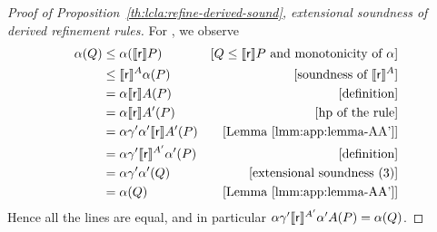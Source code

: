 \begin{proof}[Proof of Proposition~\ref{th:lcla:refine-derived-sound}, extensional soundness of derived refinement rules]
	For , we observe
	\begin{align*}
		\alpha(Q) & \le \alpha(\llbracket\mathsf{r}\rrbracket P )                   & [Q \le \llbracket\mathsf{r}\rrbracket P \text{ and monotonicity of }\alpha] \\
		          & \le \llbracket\mathsf{r}\rrbracket^{A} \alpha(P)                & [\text{soundness of }\llbracket\mathsf{r}\rrbracket^{A}]                    \\
		          & = \alpha \llbracket\mathsf{r}\rrbracket A(P)                    & [\text{definition}]                                        \\
		          & = \alpha \llbracket\mathsf{r}\rrbracket A'(P)                   & [\text{hp of the rule}]                                    \\
		          & = \alpha \gamma' \alpha' \llbracket\mathsf{r}\rrbracket A'(P)   & [\text{Lemma~\ref{lmm:app:lemma-AA'}}]                     \\
		          & = \alpha \gamma' \llbracket\mathsf{r}\rrbracket^{A'} \alpha'(P) & [\text{definition}]                                        \\
		          & = \alpha \gamma' \alpha'(Q)                    & [\text{extensional soundness (3)}]                         \\
		          & = \alpha(Q)                                    & [\text{Lemma~\ref{lmm:app:lemma-AA'}}]
	\end{align*}
	Hence all the lines are equal, and in particular $\alpha \gamma' \llbracket\mathsf{r}\rrbracket^{A'} \alpha' A(P) = \alpha(Q)$.
\end{proof}

